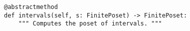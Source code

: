\begin{verbatim}
@abstractmethod
def intervals(self, s: FinitePoset) -> FinitePoset:
    """ Computes the poset of intervals. """
\end{verbatim}
